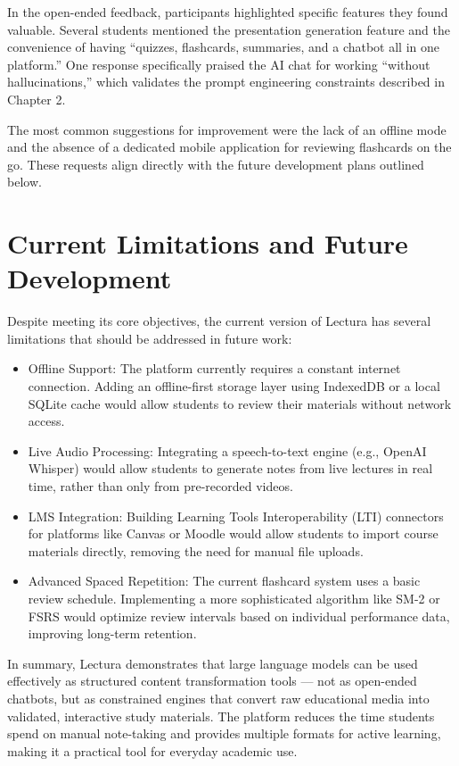 In the open-ended feedback, participants highlighted specific features they found valuable. Several students mentioned the presentation generation feature and the convenience of having ``quizzes, flashcards, summaries, and a chatbot all in one platform.'' One response specifically praised the AI chat for working ``without hallucinations,'' which validates the prompt engineering constraints described in Chapter 2.

The most common suggestions for improvement were the lack of an offline mode and the absence of a dedicated mobile application for reviewing flashcards on the go. These requests align directly with the future development plans outlined below.

\section{Current Limitations and Future Development}
Despite meeting its core objectives, the current version of Lectura has several limitations that should be addressed in future work:

\begin{itemize}[label=\textendash]
    \item Offline Support: The platform currently requires a constant internet connection. Adding an offline-first storage layer using IndexedDB or a local SQLite cache would allow students to review their materials without network access.
    \item Live Audio Processing: Integrating a speech-to-text engine (e.g., OpenAI Whisper) would allow students to generate notes from live lectures in real time, rather than only from pre-recorded videos.
    \item LMS Integration: Building Learning Tools Interoperability (LTI) connectors for platforms like Canvas or Moodle would allow students to import course materials directly, removing the need for manual file uploads.
    \item Advanced Spaced Repetition: The current flashcard system uses a basic review schedule. Implementing a more sophisticated algorithm like SM-2 or FSRS would optimize review intervals based on individual performance data, improving long-term retention.
\end{itemize}

In summary, Lectura demonstrates that large language models can be used effectively as structured content transformation tools — not as open-ended chatbots, but as constrained engines that convert raw educational media into validated, interactive study materials. The platform reduces the time students spend on manual note-taking and provides multiple formats for active learning, making it a practical tool for everyday academic use.